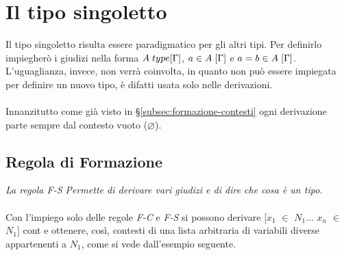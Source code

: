 \section{Il tipo singoletto}
\label{sec:tipo-singoletto}
Il tipo singoletto risulta essere paradigmatico per gli altri tipi. Per definirlo impiegher\`o i giudizi nella forma $A\hspace{0.1cm}type[\Gamma]$, $a \in A\hspace{0.1cm}[\Gamma]$ e $a = b \in A\hspace{0.1cm}[\Gamma]$. L'uguaglianza, invece, non verr\`a coinvolta, in quanto non pu\`o essere impiegata per definire un nuovo tipo, \`e difatti usata solo nelle derivazioni.\\\\
Innanzitutto come gi\`a visto in \S\ref{subsec:formazione-contesti} ogni derivazione parte sempre dal contesto vuoto ($\varnothing$).
\begin{prooftree}
\end{prooftree}

\subsection{Regola di Formazione}
\label{subsec:formazione-singoletto}
\begin{prooftree}
\end{prooftree}
\textit{La regola F-S Permette di derivare vari giudizi e di dire che cosa \`e un tipo.}\\\\
Con l'impiego solo delle regole \textit{F-C} e \textit{F-S} si possono derivare [$x_1$ $\in$ $N_1$... $x_n$ $\in$ $N_1$] cont e ottenere, cos\`i, contesti di una lista arbitraria di variabili diverse appartenenti a $N_1$, come si vede dall'esempio seguente.
\begin{prooftree}
\end{prooftree}

